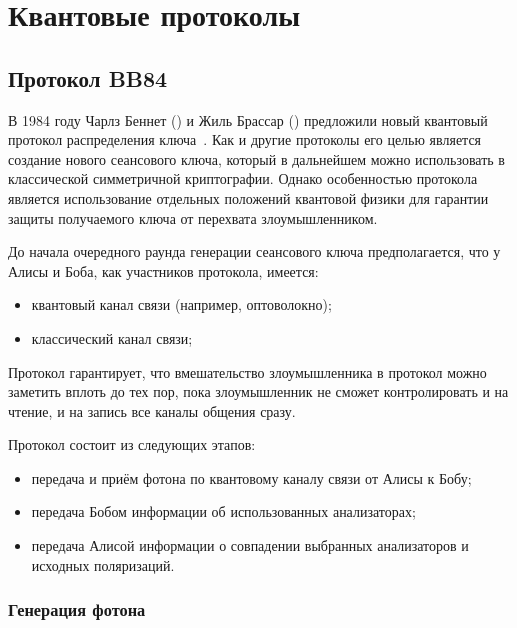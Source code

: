 \section{Квантовые протоколы}

\subsection{Протокол BB84}

В 1984 году Чарлз Беннет () и Жиль Брассар () предложили новый квантовый протокол распределения ключа~\cite{Bennett:Brassard:1984}. Как и другие протоколы его целью является создание нового сеансового ключа, который в дальнейшем можно использовать в классической симметричной криптографии. Однако особенностью протокола является использование отдельных положений квантовой физики для гарантии защиты получаемого ключа от перехвата злоумышленником.

До начала очередного раунда генерации сеансового ключа предполагается, что у Алисы и Боба, как участников протокола, имеется:

\begin{itemize}
	\item квантовый канал связи (например, оптоволокно);
	\item классический канал связи;
\end{itemize}

Протокол гарантирует, что вмешательство злоумышленника в протокол можно заметить вплоть до тех пор, пока злоумышленник не сможет контролировать и на чтение, и на запись все каналы общения сразу.

Протокол состоит из следующих этапов:

\begin{itemize}
	\item передача и приём фотона по квантовому каналу связи от Алисы к Бобу;
	\item передача Бобом информации об использованных анализаторах;
	\item передача Алисой информации о совпадении выбранных анализаторов и исходных поляризаций.
\end{itemize}


\subsubsection{Генерация фотона}

